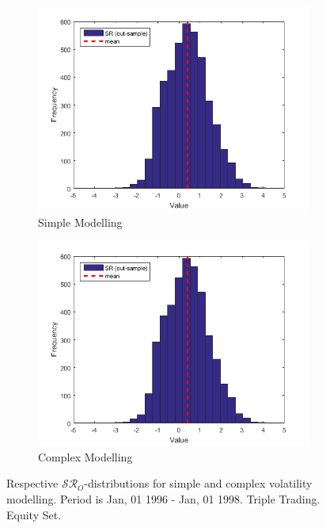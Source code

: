 \documentclass[11pt,a4,twosided,singlespacing,titlepagenumber=on]{scrreprt}
\numberwithin{equation}{chapter} %
\theoremstyle{remark}
\begin{document}
\begin{figure}[H]
    \centering
    \begin{subfigure}[t]{0.49\textwidth}
        \centering
        \includegraphics[width=1\textwidth]{res/params/2192_2923/sr}
        \caption{Simple Modelling}
    \end{subfigure}
    \begin{subfigure}[t]{0.49\textwidth}
        \centering
        \includegraphics[width=1\textwidth]{res/params/2192_2923/sr}
        \caption{Complex Modelling}
    \end{subfigure}
    \caption[]{Respective $\mathcal{SR}_O$-distributions for simple and complex volatility modelling. Period is Jan, 01 1996 - Jan, 01 1998. Triple Trading. Equity Set.}
    \label{fig:sharpe_ratio_comparison}
\end{figure}
\end{document}
